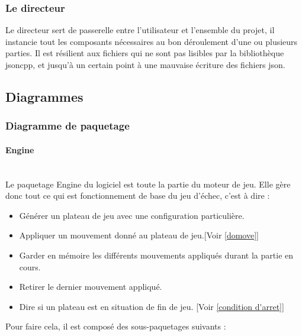 \huge\documentclass{article}
\begin{document}
\subsubsection{Le directeur}
Le directeur sert de passerelle entre l'utilisateur et l'ensemble du projet, il instancie tout les composants nécessaires au bon déroulement d'une ou plusieurs parties.
Il est résilient aux fichiers qui ne sont pas lisibles par la bibliothèque jsoncpp, et jusqu'à un certain point à une mauvaise écriture des fichiers json.

\newpage
\subsection{Diagrammes}
\subsubsection{Diagramme de paquetage}
\paragraph{Engine}
~~\\
\newline
Le paquetage Engine du logiciel est toute la partie du moteur de jeu.\newline 
Elle gère donc tout ce qui est fonctionnement de base du jeu d'échec, c'est à dire : 
\begin{itemize}
    \item Générer un plateau de jeu avec une configuration particulière.
    \item Appliquer un mouvement donné au plateau de jeu.[Voir \ref{domove}]
    \item Garder en mémoire les différents mouvements appliqués durant la partie en cours.
    \item Retirer le dernier mouvement appliqué.
    \item Dire si un plateau est en situation de fin de jeu. [Voir \ref{condition d'arret}]
\end{itemize}
Pour faire cela, il est composé des sous-paquetages suivants :
\end{document}
